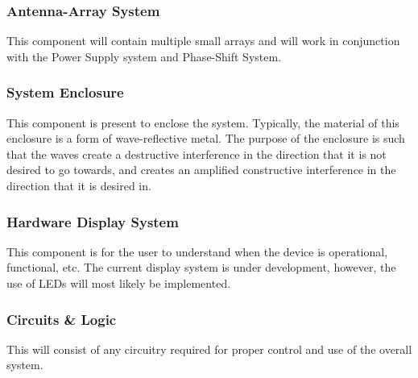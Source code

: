 \documentclass[12pt, titlepage]{article}
\begin{document}
\subsubsection{Antenna-Array System}
This component will contain multiple small arrays and will work in conjunction with the Power Supply system and Phase-Shift System.

\subsubsection{System Enclosure}
This component is present to enclose the system. Typically, the material of this enclosure is a form of wave-reflective metal. The purpose of the enclosure is such that the waves create a destructive interference in the direction that it is not desired to go towards, and creates an amplified constructive interference in the direction that it is desired in. 

\subsubsection{Hardware Display System}
This component is for the user to understand when the device is operational, functional, etc. The current display system is under development, however, the use of LEDs will most likely be implemented. 

\subsubsection{Circuits \& Logic}
This will consist of any circuitry required for proper control and use of the overall system. 
\end{document}
